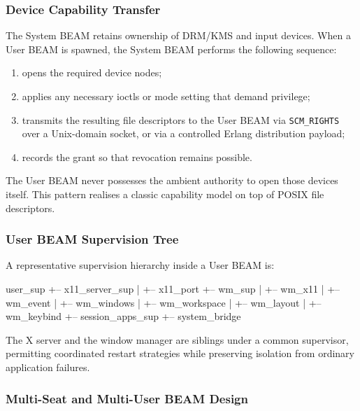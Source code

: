 \documentclass{article}
\let\originalfootnotesize\footnotesize
\let\oldverbatim\verbatim
\let\oldendverbatim\endverbatim
\renewenvironment{verbatim}{\originalfootnotesize\oldverbatim}{\oldendverbatim}
\begin{document}
\subsubsection{Device Capability Transfer}

The System BEAM retains ownership of DRM/KMS and input devices.
When a User BEAM is spawned, the System BEAM performs the following sequence:

\begin{enumerate}[nosep]
  \item opens the required device nodes;
  \item applies any necessary ioctls or mode setting that demand privilege;
  \item transmits the resulting file descriptors to the User BEAM via \texttt{SCM\_RIGHTS} over a Unix-domain socket, or via a controlled Erlang distribution payload;
  \item records the grant so that revocation remains possible.
\end{enumerate}

The User BEAM never possesses the ambient authority to open those devices itself.
This pattern realises a classic capability model on top of POSIX file descriptors.

\subsubsection{User BEAM Supervision Tree}

A representative supervision hierarchy inside a User BEAM is:

\begin{verbatim}
user_sup
+-- x11_server_sup          % Port or external OS process wrapper
|   +-- x11_port
+-- wm_sup
|   +-- wm_x11              % C Port talking to local X server
|   +-- wm_event
|   +-- wm_windows
|   +-- wm_workspace
|   +-- wm_layout
|   +-- wm_keybind
+-- session_apps_sup        % user OTP applications
+-- system_bridge           % authenticated channel to System BEAM
\end{verbatim}

The X server and the window manager are siblings under a common supervisor, permitting coordinated restart strategies while preserving isolation from ordinary application failures.

\subsubsection{Multi-Seat and Multi-User BEAM Design}
\end{document}
